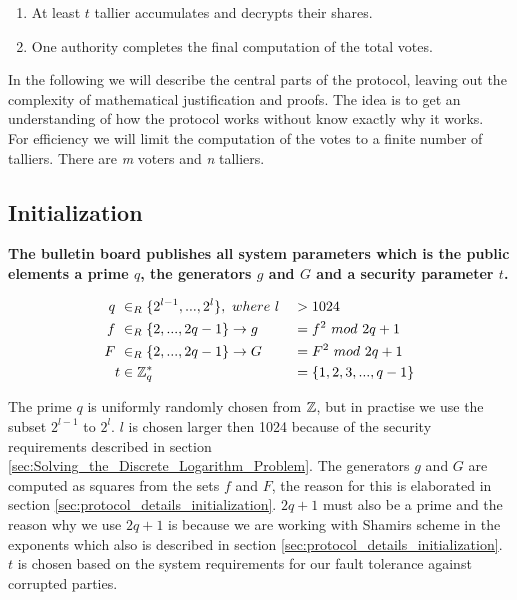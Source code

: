 \begin{enumerate}
        \begin{enumerate}
            \item At least $t$ tallier accumulates and decrypts their shares.
            
            \item One authority completes the final computation of the total votes.
        \end{enumerate}
\end{enumerate}


\noindent
In the following we will describe the central parts of the protocol, leaving out the complexity of mathematical justification and proofs. The idea is to get an understanding of how the protocol works without know exactly why it works. \\

\noindent
For efficiency we will limit the computation of the votes to a finite number of talliers. There are \textit{m} voters and \textit{n} talliers. 
\subsection{Initialization}   \label{sec:the_protocol_initialization}

\noindent
\textbf{The bulletin board publishes all system parameters which is the public elements a prime $q$,  the generators $g$ and $G$ and a security parameter $t$.}


\begin{alignat*}{2}
q \ &\in_R \{2^{l-1},...,2^{l}\}, \ where\  l &&> 1024 \\
f \ &\in_R \{2,...,2q-1\} \rightarrow g &&= f^2 \ mod\ 2q+1  \\
F \ &\in_R \{2,...,2q-1\}\rightarrow G &&= F^2 \ mod\ 2q+1 \\
t &\in \Z_q^* &&= \{1,2,3,...,q-1\} 
\end{alignat*}

\noindent
The prime $q$ is uniformly randomly chosen from $\mathbb{Z}$, but in practise we use the subset $2^{l-1}$ to $2^l$. $l$ is chosen  larger then 1024 because of the security requirements described in section \ref{sec:Solving_the_Discrete_Logarithm_Problem}. The generators $g$ and $G$ are computed as squares from the sets $f$ and $F$, the reason for this is elaborated in section \ref{sec:protocol_details_initialization}.  $2q+1$ must also be a prime and the reason why we use $2q +1$ is because we are working with Shamirs scheme in the exponents which also is described in section \ref{sec:protocol_details_initialization}. $t$ is chosen based on the system requirements for our fault tolerance against corrupted parties.\\


